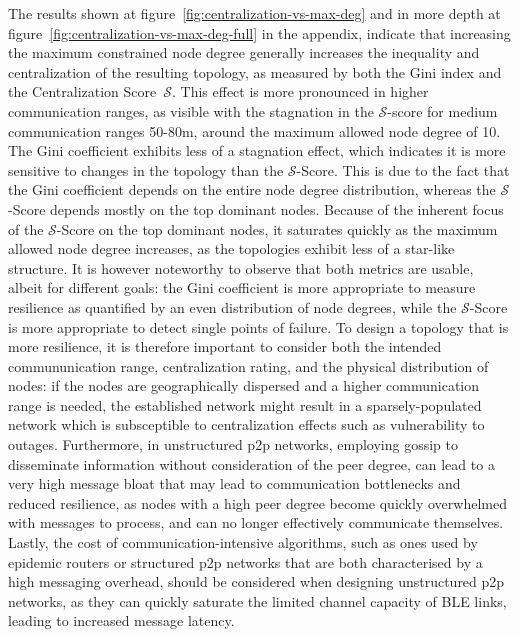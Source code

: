 The results shown at figure~\ref{fig:centralization-vs-max-deg} and in more depth at figure~\ref{fig:centralization-vs-max-deg-full} in the appendix, indicate that increasing the maximum constrained node degree generally increases the inequality and centralization of the resulting topology, as measured by both the Gini index and the Centralization Score~$\mathscr{S}$.
This effect is more pronounced in higher communication ranges, as visible with the stagnation in the $\mathscr{S}$-score for medium communication ranges 50-80m, around the maximum allowed node degree of 10.
The Gini coefficient exhibits less of a stagnation effect, which indicates it is more sensitive to changes in the topology than the $\mathscr{S}$-Score.
This is due to the fact that the Gini coefficient depends on the entire node degree distribution, whereas the $\mathscr{S}$-Score depends mostly on the top dominant nodes.
Because of the inherent focus of the $\mathscr{S}$-Score on the top dominant nodes, it saturates quickly as the maximum allowed node degree increases, as the topologies exhibit less of a star-like structure. It is however noteworthy to observe that both metrics are usable, albeit for different goals: the Gini coefficient is more appropriate to measure resilience as quantified by an even distribution of node degrees, while the $\mathscr{S}$-Score is more appropriate to detect single points of failure.
To design a topology that is more resilience, it is therefore important to consider both the intended commununication range, centralization rating, and the physical distribution of nodes: if the nodes are geographically dispersed and a higher communication range is needed, the established network might result in a sparsely-populated network which is subsceptible to centralization effects such as vulnerability to outages. 
Furthermore, in unstructured p2p networks, employing gossip to disseminate information without consideration of the peer degree, can lead to a very high message bloat that may lead to communication bottlenecks and reduced resilience, as nodes with a high peer degree become quickly overwhelmed with messages to process, and can no longer effectively communicate themselves.
Lastly, the cost of communication-intensive algorithms, such as ones used by epidemic routers or structured p2p networks that are both characterised by a high messaging overhead, should be considered when designing unstructured p2p networks, as they can quickly saturate the limited channel capacity of BLE links, leading to increased message latency.

